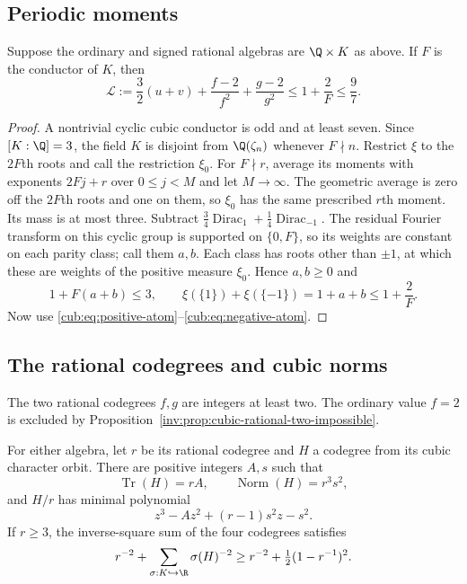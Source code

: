 \subsection{Periodic moments}
\begin{proposition}\label{cub:prop:cubic-periodic}
Suppose the ordinary and signed rational algebras are $\Q\times K$
as above. If $F$ is the conductor of $K$, then
\begin{equation}\label{cub:eq:cubic-periodic}
 \mathcal L:=\frac32(u+v)+\frac{f-2}{f^2}+\frac{g-2}{g^2}
          \le1+\frac2F\le\frac97.
\end{equation}
\end{proposition}
\begin{proof}
A nontrivial cyclic cubic conductor is odd and at least seven.
Since $[K:\Q]=3$, the field $K$ is disjoint from
$\Q(\zeta_n)$ whenever $F\nmid n$.
Restrict $\xi$ to the $2F$th roots and call the restriction $\xi_0$.
For $F\nmid r$, average its moments with exponents $2Fj+r$ over
$0\le j<M$ and let $M\to\infty$. The geometric average is zero off
the $2F$th roots and one on them, so $\xi_0$ has the same prescribed
$r$th moment. Its mass is at most three.
Subtract $\tfrac34\operatorname{Dirac}_1+
\tfrac14\operatorname{Dirac}_{-1}$. The residual Fourier transform
on this cyclic group is supported on $\{0,F\}$, so its weights are
constant on each parity class; call them $a,b$.
Each class has roots other than $\pm1$, at which these are weights
of the positive measure $\xi_0$. Hence $a,b\ge0$ and
\[
 1+F(a+b)\le3,\qquad
 \xi(\{1\})+\xi(\{-1\})=1+a+b\le1+\frac2F.
\]
Now use \eqref{cub:eq:positive-atom}--\eqref{cub:eq:negative-atom}.
\end{proof}

\subsection{The rational codegrees and cubic norms}
The two rational codegrees $f,g$ are integers at least two. The
ordinary value $f=2$ is excluded by
Proposition~\ref{inv:prop:cubic-rational-two-impossible}.

\begin{lemma}\label{cub:lem:cubic-square-norm-schur}
For either algebra, let $r$ be its rational codegree and $H$ a codegree
from its cubic character orbit. There are positive integers $A,s$ such
that
\[
 \operatorname{Tr}(H)=rA,\qquad
 \operatorname{Norm}(H)=r^3s^2,
\]
and $H/r$ has minimal polynomial
\begin{equation}\label{cub:eq:cubic-normalized-polynomial}
 z^3-Az^2+(r-1)s^2z-s^2.
\end{equation}
If $r\ge3$, the inverse-square sum of the four codegrees satisfies
\begin{equation}\label{cub:eq:cubic-uniform-schur}
 r^{-2}+\sum_{\sigma:K\hookrightarrow\R}\sigma(H)^{-2}
 \ge r^{-2}+\tfrac12(1-r^{-1})^2.
\end{equation}
\end{lemma}

